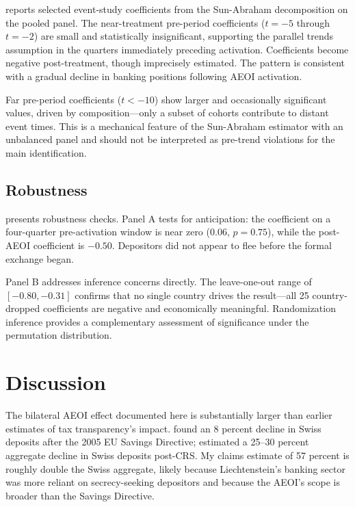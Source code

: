 \documentclass[12pt]{article}
\begin{document}
 reports selected event-study coefficients from the Sun-Abraham decomposition on the pooled panel. The near-treatment pre-period coefficients ($t = -5$ through $t = -2$) are small and statistically insignificant, supporting the parallel trends assumption in the quarters immediately preceding activation. Coefficients become negative post-treatment, though imprecisely estimated. The pattern is consistent with a gradual decline in banking positions following AEOI activation.

Far pre-period coefficients ($t < -10$) show larger and occasionally significant values, driven by composition---only a subset of cohorts contribute to distant event times. This is a mechanical feature of the Sun-Abraham estimator with an unbalanced panel and should not be interpreted as pre-trend violations for the main identification.

\subsection{Robustness}



 presents robustness checks. Panel A tests for anticipation: the coefficient on a four-quarter pre-activation window is near zero ($0.06$, $p = 0.75$), while the post-AEOI coefficient is $-0.50$. Depositors did not appear to flee before the formal exchange began.

Panel B addresses inference concerns directly. The leave-one-out range of $[-0.80, -0.31]$ confirms that no single country drives the result---all 25 country-dropped coefficients are negative and economically meaningful. Randomization inference provides a complementary assessment of significance under the permutation distribution.


\section{Discussion}

The bilateral AEOI effect documented here is substantially larger than earlier estimates of tax transparency's impact. \citet{johannesen2014end} found an 8 percent decline in Swiss deposits after the 2005 EU Savings Directive; \citet{menkhoff2022tax} estimated a 25--30 percent aggregate decline in Swiss deposits post-CRS. My claims estimate of 57 percent is roughly double the Swiss aggregate, likely because Liechtenstein's banking sector was more reliant on secrecy-seeking depositors and because the AEOI's scope is broader than the Savings Directive.
\end{document}
